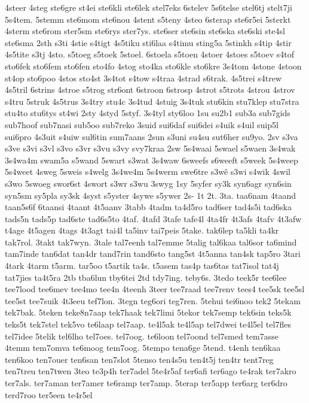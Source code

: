 4steer
4steg
ste6gre
st4ei
ste6kli
ste6lek
stel7eks
6stelev
5s6telse
stel6tj
stelt7ji
5s4tem.
5stemm
ste6mom
ste6nou
4stent
s5teny
4steo
6sterap
ste6r5ei
5sterkt
4sterm
ste6rom
ster5sm
ste6rys
ster7ys.
ste6ser
ste6sin
ste6ska
ste6ski
ste4sl
ste6sma
2sth
s3ti
4stie
s4tigt
4s5tiku
sti6laa
s4timu
sting5a
5stinkh
s4tip
4stir
4s5tite
s3tj
4sto.
s5toeg
s5toek
5stoel.
6stoela
s5toen
4stoer
4stoes
s5toev
s4tof
sto6fek
sto6fem
sto6fen
sto4fo
4stog
sto4ka
sto6kle
sto6kre
3s4tom
4stone
4stoon
st4op
sto6poo
4stos
sto4st
3s4tot
s4tow
s4traa
4strad
s6trak.
4s5trei
s4trew
4s5tril
6strins
4stroe
s5trog
str6ont
6stroon
6strosp
4strot
s5trots
4strou
4strov
s4tru
5struk
4s5trus
3s4try
stu4c
3s4tud
4stuig
3s4tuk
stu6kin
stu7klep
stu7stra
stu4to
stu6tys
st4wi
2sty
4styd
5styf.
3s4tyl
sty6loo
1su
su2b1
sub3a
sub7gids
sub7hoof
sub7nasi
sub5oo
sub7reko
3suid
sui6daf
sui6dei
s4uik
s4uil
suip5l
sui6pro
4s3uit
s4uiw
sul6tin
sum7aans
2sun
s3uni
su4su
sut6her
su9yo.
2sv
s3va
s3ve
s3vi
s3vl
s3vo
s3vr
s3vu
s3vy
svy7kraa
2sw
5s4waai
5swael
s5waen
3s4wak
3s4wa4m
swam5a
s5wand
5swart
s3wat
3s4waw
6sweefs
s6weeft
s5week
5s4weep
5s4weet
4sweg
5sweis
s4welg
3s4we4m
5s4werm
swe6tre
s3wê
s3wi
s4wik
4swil
s3wo
5swoeg
swor6st
4swort
s3wr
s3wu
3swyg
1sy
5syfer
sy3k
syn6agr
syn6sin
syn5sm
sy5pla
sy3sk
4syst
s5yster
4sywe
s5ywer
2s-
1t
2t.
3ta.
taa6nam
4taand
taan5s6f
6taansi
4taant
4t5aanv
3tabb
4tadm
ta4d5ro
tad6ser
tad4s5i
tad6ska
tads5n
tads5p
tad6ste
tad6s5to
4taf.
4tafd
3tafe
tafe4l
4ta4fr
4t3afs
4tafv
4t3afw
t4age
4t5agen
4tags
4t3agt
tai4l
ta5inv
tai7peis
5take.
tak6lep
ta5kli
ta4kr
tak7rol.
3takt
tak7wyn.
3tale
tal7eenh
tal7emme
5talig
tal6kaa
tal6sor
ta6mind
tam7inde
tan6dat
tan4dr
tand7rin
tand6sto
tang5st
4t5anna
tan4sk
tap5ro
3tari
4tark
4tarm
t5arm.
tar5oo
t5artik
ta4s.
t5asem
tas4p
tas6tas
tat7isol
tat4j
tat7jies
ta4t5ra
2tb
tba6lun
tby6tei
2td
tdy7ing.
teby6s.
3tedo
teek5r
tee6lee
tee7lood
tee6mev
tee4mo
tee4n
4teenh
3teer
tee7raad
tee7renv
tees4
tee5sk
tee5sl
tee5st
tee7suik
4t3eeu
tef7lon.
3tegn
teg6ori
teg7ren.
5tehui
tei6noo
tek2
5tekam
tek7bak.
5teken
teke8n7aap
tek7haak
tek7limi
5tekor
tek7semp
tek6sin
teks5k
teks5t
tek7stel
tek5vo
te6laap
tel7aap.
te4l5ak
te4l5ap
tel7dwei
te4l5el
tel7fles
tel7idee
5telik
tel6lho
tel7oes.
tel7oog.
te6loon
tel7oond
tel7smed
tem7asse
4temm
tem7omva
te6moog
tem7oog.
5tempo
tena6ge
5tend.
t4enh
ten6kaa
ten6koo
ten7ouer
ten6san
ten7slot
5tenso
ten4s5u
ten4t5j
ten4tr
tent7reg
ten7treu
ten7twen
3teo
te3p4h
ter7adel
5te4r5af
ter6afi
ter6ago
te4rak
ter7akro
ter7als.
ter7aman
ter7amer
te6ramp
ter7amp.
5terap
ter5app
ter6arg
ter6dro
terd7roo
ter5een
te4r5el
